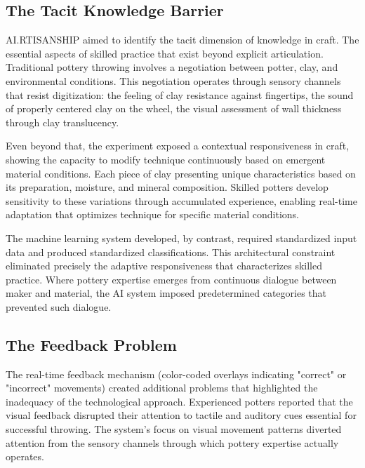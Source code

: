 \subsection{The Tacit Knowledge Barrier}

AI.RTISANSHIP aimed to identify the tacit dimension of knowledge in craft. The essential aspects of skilled practice that exist beyond explicit articulation. Traditional pottery throwing involves a negotiation between potter, clay, and environmental conditions. This negotiation operates through sensory channels that resist digitization: the feeling of clay resistance against fingertips, the sound of properly centered clay on the wheel, the visual assessment of wall thickness through clay translucency.

\vspace{0.5cm}

Even beyond that, the experiment exposed a contextual responsiveness in craft, showing the capacity to modify technique continuously based on emergent material conditions. Each piece of clay presenting unique characteristics based on its preparation, moisture, and mineral composition. Skilled potters develop sensitivity to these variations through accumulated experience, enabling real-time adaptation that optimizes technique for specific material conditions.

\vspace{0.5cm}

The machine learning system developed, by contrast, required standardized input data and produced standardized classifications. This architectural constraint eliminated precisely the adaptive responsiveness that characterizes skilled practice. Where pottery expertise emerges from continuous dialogue between maker and material, the AI system imposed predetermined categories that prevented such dialogue.







\subsection{The Feedback Problem}

The real-time feedback mechanism (color-coded overlays indicating "correct" or "incorrect" movements) created additional problems that highlighted the inadequacy of the technological approach. Experienced potters reported that the visual feedback disrupted their attention to tactile and auditory cues essential for successful throwing. The system's focus on visual movement patterns diverted attention from the sensory channels through which pottery expertise actually operates.

